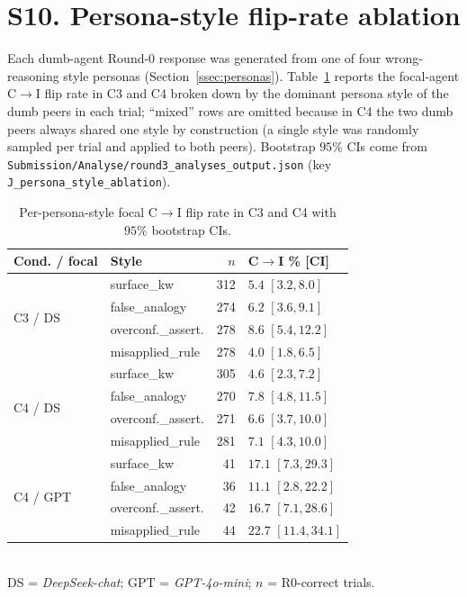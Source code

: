 \documentclass[11pt]{article}
\begin{document}
\section*{S10. Persona-style flip-rate ablation}
\label{ssec:persona_ablation}

Each dumb-agent Round-0 response was generated from one of four
wrong-reasoning style personas (Section~\ref{ssec:personas}).
Table~\ref{stab:persona_ablation} reports the focal-agent
C$\rightarrow$I flip rate in C3 and C4 broken down by the dominant
persona style of the dumb peers in each trial; ``mixed'' rows are
omitted because in C4 the two dumb peers always shared one style by
construction (a single style was randomly sampled per trial and
applied to both peers).
Bootstrap $95\%$ CIs come from
\texttt{Submission/\allowbreak Analyse/\allowbreak round3\_\allowbreak analyses\_\allowbreak output.json}
(key \texttt{J\_persona\_\allowbreak style\_ablation}).

\begin{table}[h]
\centering\footnotesize
\caption{Per-persona-style focal C$\rightarrow$I flip rate in C3 and
C4 with $95\%$ bootstrap CIs.
\label{stab:persona_ablation}}
\begin{tabular}{@{}llrl@{}}
\toprule
Cond. / focal & Style & $n$ & C$\to$I \% [CI] \\
\midrule
\multirow{4}{*}{C3 / DS}
  & surface\_kw    & 312 & $5.4$ $[3.2, 8.0]$ \\
  & false\_analogy & 274 & $6.2$ $[3.6, 9.1]$ \\
  & overconf.\_assert. & 278 & $8.6$ $[5.4, 12.2]$ \\
  & misapplied\_rule  & 278 & $4.0$ $[1.8, 6.5]$ \\
\midrule
\multirow{4}{*}{C4 / DS}
  & surface\_kw    & 305 & $4.6$ $[2.3, 7.2]$ \\
  & false\_analogy & 270 & $7.8$ $[4.8, 11.5]$ \\
  & overconf.\_assert. & 271 & $6.6$ $[3.7, 10.0]$ \\
  & misapplied\_rule  & 281 & $7.1$ $[4.3, 10.0]$ \\
\midrule
\multirow{4}{*}{C4 / GPT}
  & surface\_kw    & 41  & $17.1$ $[7.3, 29.3]$ \\
  & false\_analogy & 36  & $11.1$ $[2.8, 22.2]$ \\
  & overconf.\_assert. & 42  & $16.7$ $[7.1, 28.6]$ \\
  & misapplied\_rule  & 44  & $22.7$ $[11.4, 34.1]$ \\
\bottomrule
\end{tabular}
\\[1pt]
{\scriptsize DS = \textit{DeepSeek-chat}; GPT = \textit{GPT-4o-mini};
$n$ = R0-correct trials.}
\end{table}
\end{document}

